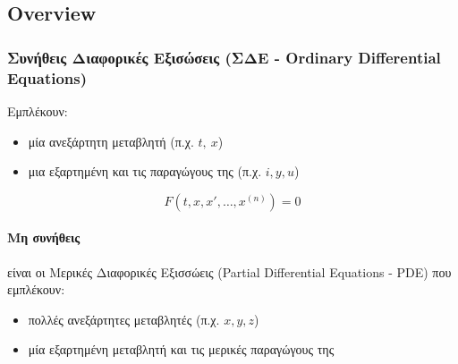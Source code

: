 \documentclass[11pt,a4paper,titlepage,final]{article}
\begin{document}
\subsection{\textlatin{Overview}}

\subsubsection{Συνήθεις Διαφορικές Εξισώσεις (ΣΔΕ - \textlatin{Ordinary Differential Equations})}

\begin{defn}{}{}
Εμπλέκουν:
\begin{itemize}
\item μία ανεξάρτητη μεταβλητή (π.χ. \(t,\ x\))
\item μια εξαρτημένη και τις παραγώγους της (π.χ. \(i,y,u\))
\end{itemize}
\[
F(t,x,x',\dots,x^{(n)}) = 0
\]
\end{defn}{}{}

\paragraph{Μη συνήθεις}
είναι οι Μερικές Διαφορικές Εξισσώεις \textlatin{(Partial Differential Equations - PDE)} που εμπλέκουν:
\begin{itemize}
\item πολλές ανεξάρτητες μεταβλητές (π.χ. \(x,y,z\))
\item μία εξαρτημένη μεταβλητή και τις μερικές παραγώγους της
\end{itemize}
\end{document}
